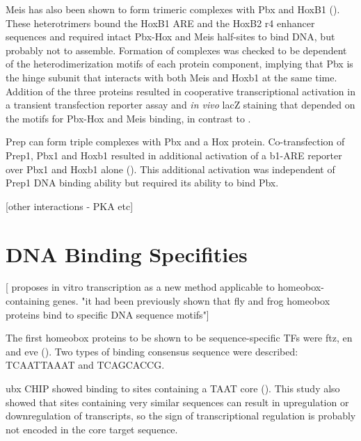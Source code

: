 Meis has also been shown to form trimeric complexes with Pbx and HoxB1 (\cite{Jacobs1999}). These heterotrimers bound the HoxB1 ARE and the HoxB2 r4 enhancer sequences and required intact Pbx-Hox and Meis half-sites to bind DNA, but probably not to assemble. Formation of complexes was checked to be dependent of the heterodimerization motifs of each protein component, implying that Pbx is the hinge subunit that interacts with both Meis and Hoxb1 at the same time. Addition of the three proteins resulted in cooperative transcriptional activation in a transient transfection reporter assay and \textit{in vivo} lacZ staining that depended on the motifs for Pbx-Hox and Meis binding, in contrast to \cite{Shen1999}. 




Prep can form triple complexes with Pbx and a Hox protein. Co-transfection of Prep1, Pbx1 and Hoxb1 resulted in additional activation of a b1-ARE reporter over Pbx1 and Hoxb1 alone (\cite{Berthelsen1998}). This additional activation was independent of Prep1 DNA binding ability but required its ability to bind Pbx.

[other interactions - PKA etc]

\section{DNA Binding Specifities}
\label{sec:specificites}
[\cite{Levine1988} proposes in vitro transcription as a new method applicable to homeobox-containing genes. "it had been previously shown that fly and frog homeobox proteins bind to specific DNA sequence motifs"]
		
The first homeobox proteins to be shown to be sequence-specific \acp{TF} were \ac{ftz}, \ac{en} and \ac{eve} (\cite{Desplan1988,Hoey1988,Hoey1988a}). Two types of binding consensus sequence were described: TCAATTAAAT and TCAGCACCG.
		
\ac{ubx} \ac{CHIP} showed binding to sites containing a TAAT core (\cite{Gould1990}). This study also showed that sites containing very similar sequences can result in upregulation or downregulation of transcripts, so the sign of transcriptional regulation is probably not encoded in the core target sequence.


